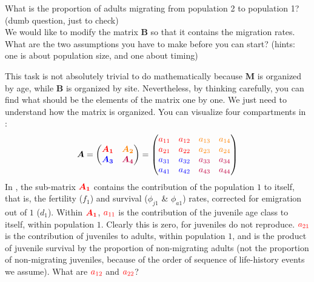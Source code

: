 \documentclass{article}\usepackage[]{graphicx}\usepackage[]{color}
\begin{document}
What is the proportion of adults migrating from population 2 to population 1? (dumb question, just to check)\\

We would like to modify the matrix $\boldsymbol{B}$ so that it contains the migration rates. \\
What are the two assumptions you have to make before you can start? 
(hints: one is about population size, and one about timing)%

This task is not absolutely trivial to do mathematically because $\boldsymbol{M}$ is organized by age, while $\boldsymbol{B}$ is organized by site. 
Nevertheless, by thinking carefully, you can find what should be the elements of the matrix one by one. We just need to understand how the matrix is organized.
You can visualize four compartments in :
\begin{align*}
\boldsymbol{A}=
\begin{pmatrix}
\boldsymbol{\color{red}{A_1}} & \boldsymbol{\color{orange}{A_2}} \\
\boldsymbol{\color{blue}{A_3}} & \boldsymbol{\color{purple}{A_4}}
\end{pmatrix}
=\begin{pmatrix}
  \color{red}{a_{11}} & \color{red}{a_{12}} & \color{orange}{a_{13}} & \color{orange}{a_{14}}\\
  \color{red}{a_{21}} & \color{red}{a_{22}} & \color{orange}{a_{23}} & \color{orange}{a_{24}}\\
  \color{blue}{a_{31}} & \color{blue}{a_{32}} & \color{purple}{a_{33}} & \color{purple}{a_{34}}\\
  \color{blue}{a_{41}} & \color{blue}{a_{42}} & \color{purple}{a_{43}} & \color{purple}{a_{44}}\\
\end{pmatrix}
\end{align*}
In {\color{red}{red}}, the sub-matrix $\boldsymbol{\color{red}{A_1}}$ contains the contribution of the population $1$ to itself, that is, the fertility ($f_1$) and survival ($\phi_{j1}$ & $\phi_{a1}$) rates, corrected for emigration out of $1$ ($d_1$). Within $\boldsymbol{\color{red}{A_1}}$, $\color{red}{a_{11}}$ is the contribution of the juvenile age class to itself, within population $1$. Clearly this is zero, for juveniles do not reproduce. $\color{red}{a_{21}}$ is the contribution of juveniles to adults, within population $1$, and is the product of juvenile survival by the proportion of non-migrating adults (not the proportion of non-migrating juveniles, because of the order of sequence of life-history events we assume). 
What are $\color{red}{a_{12}}$ and $\color{red}{a_{22}}$?
\end{document}
